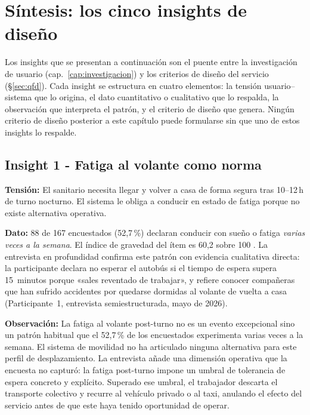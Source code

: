 
\section{S\'intesis: los cinco insights de dise\~no}
\label{sec:insights}

Los insights que se presentan a continuación son el puente entre
la investigación de usuario (cap.~\ref{cap:investigacion}) y los
criterios de diseño del servicio (§\ref{sec:qfd}). Cada insight
se estructura en cuatro elementos: la tensión usuario--sistema que lo origina, el dato cuantitativo o cualitativo que lo respalda, la observación que interpreta el patrón, y el criterio de diseño que genera. Ningún criterio de diseño
posterior a este capítulo puede formularse sin que uno de estos
insights lo respalde.


\subsection*{Insight 1 - Fatiga al volante como norma}
\label{sec:insight-1}

\textbf{Tensión:} El sanitario necesita llegar y volver a casa
de forma segura tras 10--12\,h de turno nocturno. El sistema
le obliga a conducir en estado de fatiga porque no existe
alternativa operativa.

\textbf{Dato:} 88 de 167 encuestados (52{,}7\,\%) declaran
conducir con sueño o fatiga \emph{varias veces a la semana}.
El índice de gravedad del ítem es 60{,}2 sobre 100
\parencite{LouridoRegueira2026}. La entrevista en profundidad
confirma este patrón con evidencia cualitativa directa: la
participante declara no esperar el autobús si el tiempo de
espera supera 15~minutos porque «sales reventado de trabajar»,
y refiere conocer compañeras que han sufrido accidentes por
quedarse dormidas al volante de vuelta a casa
(Participante~1, entrevista semiestructurada, mayo de 2026).

\textbf{Observación:} La fatiga al volante post-turno no es un
evento excepcional sino un patrón habitual que el 52{,}7\,\%
de los encuestados experimenta varias veces a la semana. El
sistema de movilidad no ha articulado ninguna alternativa para
este perfil de desplazamiento. La entrevista añade una dimensión
operativa que la encuesta no capturó: la fatiga post-turno
impone un umbral de tolerancia de espera concreto y explícito.
Superado ese umbral, el trabajador descarta el transporte
colectivo y recurre al vehículo privado o al taxi, anulando el
efecto del servicio antes de que este haya tenido oportunidad
de operar.

